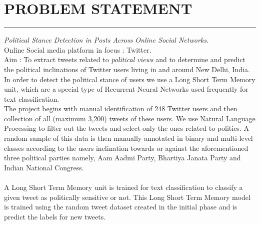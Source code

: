 \documentclass[a4paper,11pt]{article}
\begin{document}
\newpage
    
\section{PROBLEM STATEMENT}
\hrule
\vspace*{5mm}
\textit{Political Stance Detection in Posts Across Online Social Networks.}\medskip\\
Online Social media platform in focus : Twitter.\\
Aim : To extract tweets related to \textit{political views} and to determine and predict the political inclinations of Twitter users living in and around New Delhi, India.
\medskip\\
In order to detect the political stance of users we use a Long Short Term Memory unit, which are a special type of Recurrent Neural Networks used frequently for text classification.
\medskip\\
The project begins with manual identification of 248 Twitter users and then collection of all (maximum 3,200) tweets of these users. We use Natural Language Processing to filter out the tweets and select only the ones related to politics. A random sample of this data is then manually annotated in binary and multi-level classes according to the users inclination towards or against the aforementioned three political parties namely, Aam Aadmi Party, Bhartiya Janata Party and Indian National Congress.\\
\medskip\\
A Long Short Term Memory unit is trained for text classification to classify a given tweet as politically sensitive or not. This Long Short Term Memory model is trained using the random tweet dataset created in the initial phase and is predict the labels for new tweets.

\newpage
\end{document}

